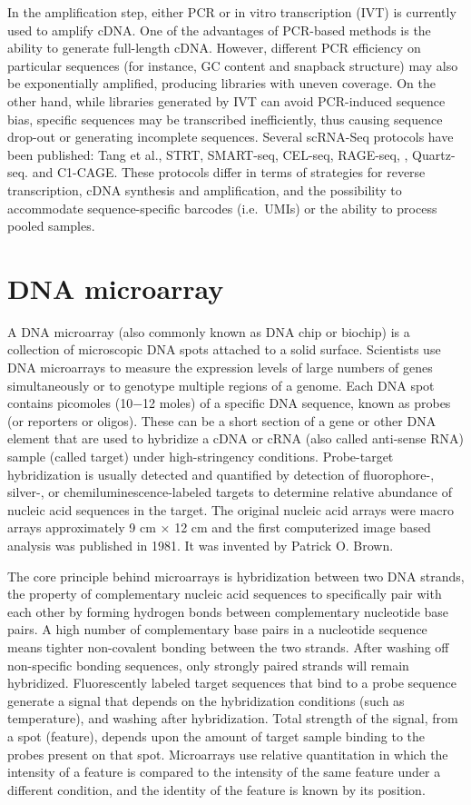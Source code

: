 In the amplification step, either PCR or in vitro transcription (IVT) is currently used to amplify cDNA. One of the advantages of PCR-based methods is the ability to generate full-length cDNA. However, different PCR efficiency on particular sequences (for instance, GC content and snapback structure) may also be exponentially amplified, producing libraries with uneven coverage. On the other hand, while libraries generated by IVT can avoid PCR-induced sequence bias, specific sequences may be transcribed inefficiently, thus causing sequence drop-out or generating incomplete sequences. Several scRNA-Seq protocols have been published: Tang et al., STRT, SMART-seq, CEL-seq, RAGE-seq, , Quartz-seq. and C1-CAGE. These protocols differ in terms of strategies for reverse transcription, cDNA synthesis and amplification, and the possibility to accommodate sequence-specific barcodes (i.e.~UMIs) or the ability to process pooled samples.

\hypertarget{dna-microarray}{%
\section{DNA microarray}\label{dna-microarray}}

A DNA microarray (also commonly known as DNA chip or biochip) is a collection of microscopic DNA spots attached to a solid surface. Scientists use DNA microarrays to measure the expression levels of large numbers of genes simultaneously or to genotype multiple regions of a genome. Each DNA spot contains picomoles (10−12 moles) of a specific DNA sequence, known as probes (or reporters or oligos). These can be a short section of a gene or other DNA element that are used to hybridize a cDNA or cRNA (also called anti-sense RNA) sample (called target) under high-stringency conditions. Probe-target hybridization is usually detected and quantified by detection of fluorophore-, silver-, or chemiluminescence-labeled targets to determine relative abundance of nucleic acid sequences in the target. The original nucleic acid arrays were macro arrays approximately 9 cm × 12 cm and the first computerized image based analysis was published in 1981. It was invented by Patrick O. Brown.

The core principle behind microarrays is hybridization between two DNA strands, the property of complementary nucleic acid sequences to specifically pair with each other by forming hydrogen bonds between complementary nucleotide base pairs. A high number of complementary base pairs in a nucleotide sequence means tighter non-covalent bonding between the two strands. After washing off non-specific bonding sequences, only strongly paired strands will remain hybridized. Fluorescently labeled target sequences that bind to a probe sequence generate a signal that depends on the hybridization conditions (such as temperature), and washing after hybridization. Total strength of the signal, from a spot (feature), depends upon the amount of target sample binding to the probes present on that spot. Microarrays use relative quantitation in which the intensity of a feature is compared to the intensity of the same feature under a different condition, and the identity of the feature is known by its position.

